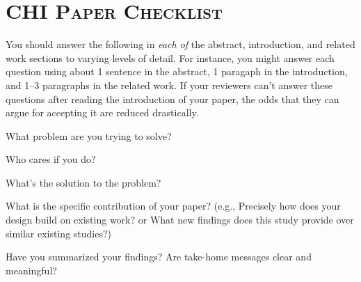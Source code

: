 

\newenvironment{checklist}{%
  \begin{list}{}{}%
  \let\olditem\item
  \renewcommand\item{\olditem[$\Box$] }
}{%
  \end{list}
}


\section*{\textsc{CHI Paper Checklist}}


\noindent\makebox[\linewidth]{\rule{\linewidth}{0.4pt}}

You should answer the following in \emph{each of} the abstract, introduction, and related work sections to varying levels of detail. For instance, you might answer each question using about 1 sentence in the abstract, 1 paragaph in the introduction, and 1--3 paragraphs in the related work. If your reviewers can't answer these questions after reading the introduction of your paper, the odds that they can argue for accepting it are reduced drastically. 

\begin{checklist}
    \item What problem are you trying to solve?
    \item Who cares if you do? 
    \item What's the solution to the problem? 
	\item What is the specific contribution of your paper? (e.g., Precisely how does your design build on existing work? or What new findings does this study provide over similar existing studies?)
	\item Have you summarized your findings? Are take-home messages clear and meaningful? 
\end{checklist}

